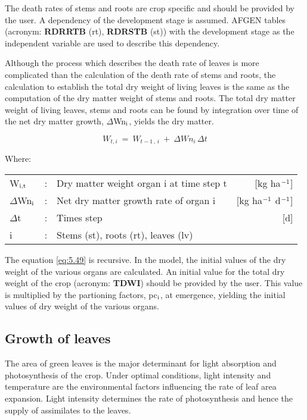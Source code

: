 The death rates of stems and roots are crop specific and should be provided by the user.
A dependency of the development stage is assumed. AFGEN tables (acronym: {\bf RDRRTB}
(rt), {\bf RDRSTB} (st)) with the development stage as the independent variable are used to
describe this dependency.

Although the process which describes the death rate of leaves is more complicated than
the calculation of the death rate of stems and roots, the calculation to establish the total
dry weight of living leaves is the same as the computation of the dry matter weight of
stems and roots. The total dry matter weight of living leaves, stems and roots can be
found by integration over time of the net dry matter growth, $\Delta$Wn$_{{\rm i}}$, yields 
the dry matter.

\begin{equation}
\label{eq:5.49}
W _{t,i} ~=~W _{t-1\, ,\, i} ~+~\Delta Wn _{i} \,\Delta t
\end{equation}

Where:\\[5pt]
\begin{tabularx}{\textwidth}{llXr}
	W$_{{\rm i,t}}$ &:& Dry matter weight organ i at time step t   &
	[kg ha$^{{\rm -1}}$]\\
	$\Delta$Wn$_{{\rm i}}$ &:& Net dry matter growth rate of organ i   &
	[kg ha$^{{\rm -1}}$ d$^{{\rm -1}}$]\\
	$\Delta$t &:& Times step   &
	[d]\\
	i &:& Stems (st), roots (rt), leaves (lv)\\
\end{tabularx}

The equation \ref{eq:5.49} is recursive. In the model, the initial values of the dry weight of the
various organs are calculated. An initial value for the total dry weight of the crop
(acronym: {\bf TDWI}) should be provided by the user. This value is multiplied by the
partioning factors, pc$_{{\rm i}}$, at emergence, yielding the initial values of dry weight of the
various organs.

\subsection{Growth of leaves}
\label{sec:growthofleaves}
The area of green leaves is the major determinant for light absorption and photosynthesis
of the crop. Under optimal conditions, light intensity and temperature are the environmental factors influencing the rate of leaf area expansion. Light intensity determines the
rate of photosynthesis and hence the supply of assimilates to the leaves.

